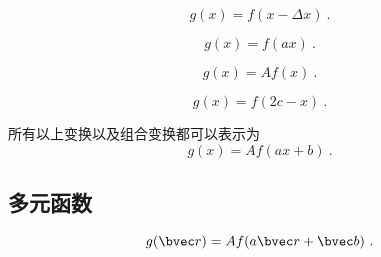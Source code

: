 
\begin{issues}
\issueDraft
\end{issues}

\begin{equation}
g(x) = f(x - \Delta x)~.
\end{equation}

\begin{equation}
g(x) = f(ax)~.
\end{equation}

\begin{equation}
g(x) = A f(x)~.
\end{equation}

\begin{equation}
g(x) = f(2c - x)~.
\end{equation}

所有以上变换以及组合变换都可以表示为
\begin{equation}
g(x) = Af(ax + b)~.
\end{equation}




\subsection{多元函数}
\begin{equation}
g(\bvec r) = Af(a\bvec r + \bvec b)~.
\end{equation}
